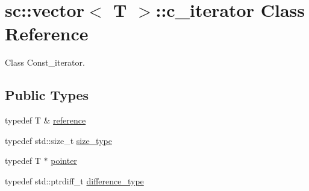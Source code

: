 \hypertarget{classsc_1_1vector_1_1c__iterator}{}\section{sc\+:\+:vector$<$ T $>$\+:\+:c\+\_\+iterator Class Reference}
\label{classsc_1_1vector_1_1c__iterator}


Class Const\+\_\+iterator.  


\subsection*{Public Types}
\begin{DoxyCompactItemize}
\item 
typedef T \& \hyperlink{classsc_1_1vector_1_1c__iterator_a562cdec5275111586d672e9ac3f22b4a}{reference}
\item 
typedef std\+::size\+\_\+t \hyperlink{classsc_1_1vector_1_1c__iterator_a0782c02315d2d1a91a491f8e5347c228}{size\+\_\+type}
\item 
typedef T $\ast$ \hyperlink{classsc_1_1vector_1_1c__iterator_a22d0479c5e0aa9433114c50122ff8a20}{pointer}
\item 
typedef std\+::ptrdiff\+\_\+t \hyperlink{classsc_1_1vector_1_1c__iterator_ad00b7c971e9e1ee7b9f3954d8df9b0d6}{difference\+\_\+type}
\end{DoxyCompactItemize}
